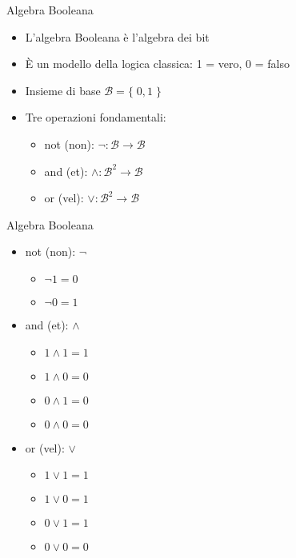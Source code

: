 \documentclass[xcolor=dvipsnames,handout]{beamer}
\begin{document}
\begin{frame}{Algebra Booleana}
  \vfill
  \begin{itemize}
    \item L'algebra Booleana è l'algebra dei bit
    \vfill
    \item È un \alert{modello} della logica classica: 1 = vero, 0 = falso
    \vfill
    \item Insieme di base \(\mathcal{B} = \{ \; 0, 1 \; \}\)
    \vfill
    \item Tre operazioni fondamentali:
    \begin{itemize}
      \item \alert{not} (non): \(\lnot : \mathcal{B} \to \mathcal{B}\)
      \item \alert{and} (et): \(\land : \mathcal{B}^2 \to \mathcal{B}\)
      \item \alert{or} (vel): \(\lor : \mathcal{B}^2 \to \mathcal{B}\)
    \end{itemize}
  \end{itemize}
  \vfill
\end{frame}

\begin{frame}{Algebra Booleana}
  \begin{itemize}
      \item \alert{not} (non): \(\lnot\)
      \begin{itemize}
        \item \(\lnot 1 = 0\)
        \item \(\lnot 0 = 1\)
      \end{itemize}
      \vfill
      \item \alert{and} (et): \(\land\)
      \begin{itemize}
        \item \(1 \land 1 = 1\)
        \item \(1 \land 0 = 0\)
        \item \(0 \land 1 = 0\)
        \item \(0 \land 0 = 0\)
      \end{itemize}
      \vfill
      \item \alert{or} (vel): \(\lor\)
      \begin{itemize}
        \item \(1 \lor 1 = 1\)
        \item \(1 \lor 0 = 1\)
        \item \(0 \lor 1 = 1\)
        \item \(0 \lor 0 = 0\)
      \end{itemize}
  \end{itemize}
\end{frame}
\end{document}
